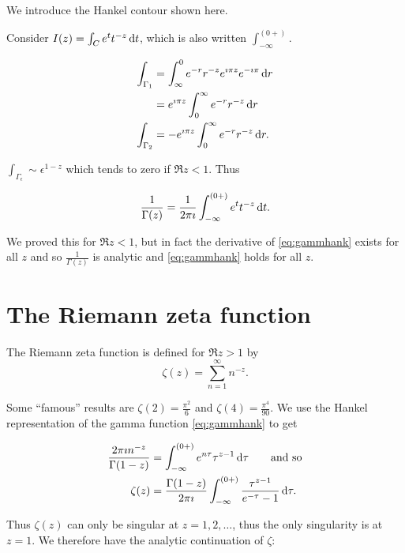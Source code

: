 \documentclass{notes}
\theoremstyle{plain}
\begin{document}
We introduce the Hankel contour shown here.

\vspace{1.5in}

Consider $I(z) = \int_C e^t t^{-z}\, \mathrm{d} t$, which is also written
$\int_{-\infty}^{(0+)}$.

\begin{align*}
\int_{\Gamma_1} & = \int_\infty^0 e^{-r} r^{-z} e^{\imath \pi z}
e^{-\imath \pi}\,\mathrm{d} r \\
&= e^{\imath \pi z} \int_0^\infty e^{-r} r^{-z}\, \mathrm{d} r\\
\int_{\Gamma_2} & = - e^{\imath \pi z} \int_0^\infty e^{-r} r^{-z}\, \mathrm{d} r.
\end{align*}

$\int_{\Gamma_\epsilon} \sim \epsilon^{1-z}$ which tends to zero if
$\Re z < 1$.  Thus

\begin{equation}\label{eq:gammhank}
\frac{1}{\Gamma(z)} = \frac{1}{2 \pi \imath}
\int_{-\infty}^{(0+)} e^t t^{-z}\, \mathrm{d} t.
\end{equation}

We proved this for $\Re z < 1$, but in fact the derivative of
\eqref{eq:gammhank} exists for all $z$ and so $\frac{1}{\Gamma(z)}$
is analytic and \eqref{eq:gammhank} holds for all $z$.

\section{The Riemann zeta function}

The Riemann zeta function is defined for $\Re z > 1$ by
\begin{equation}\label{eq:riezeta}
\zeta(z) = \sum_{n=1}^\infty n^{-z}.
\end{equation}

Some ``famous'' results are $\zeta(2) = \frac{\pi^2}{6}$ and
$\zeta(4) = \frac{\pi^4}{90}$.  We use the Hankel representation
of the gamma function \eqref{eq:gammhank} to get

\begin{align*}
\frac{2 \pi \imath n^{-z} }{\Gamma(1-z)} &=
\int_{-\infty}^{(0+)} e^{n \tau} \tau^{z-1}\, \mathrm{d} \tau \qquad \text{and so}\\
\zeta(z) &= \frac{\Gamma(1-z)}{2 \pi \imath}
\int_{-\infty}^{(0+)} \frac{\tau^{z-1}}{e^{-\tau} - 1}\, \mathrm{d} \tau.
\end{align*}

Thus $\zeta(z)$ can only be singular at $z = 1,2,\dots$, thus the
only singularity is at $z=1$.  We therefore have the analytic
continuation of $\zeta$:
\end{document}
